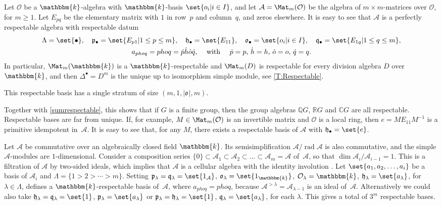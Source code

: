 \documentclass[a4paper,11pt]{amsart}
\numberwithin{equation}{subsection}
\theoremstyle{definition}
\theoremstyle{theorem}
\theoremstyle{remark}
\newcommand\CA{\mathcal{A}}
\newcommand\CO{\mathcal{O}}
\newcommand\plam[1][\lambda]{\mathfrak{p}_{#1}}
\newcommand\hlam[1][\lambda]{\mathfrak{h}_{#1}}
\newcommand\qlam[1][\lambda]{\mathfrak{q}_{#1}}
\newcommand\Olam[1][\lambda]{\CO_{#1}}
\newcommand\olam[1][\lambda]{\mathfrak{o}_{#1}}
\newcommand\op{\operatorname}
\newcommand\C{\mathbb{C}}
\newcommand\Q{\mathbb{Q}}
\newcommand\R{\mathbb{R}}
\newcommand\kk{\mathbbm{k}}
\begin{document}
  \begin{Example}\label{prototype}
    Let $\CO$ be a  $\kk$-algebra with $\kk$-basis
    $\set{o_i|i\in I}$, and let $\CA=\Mat_m(\CO)$ be the algebra of
    $m\times m$-matrices over $\CO$, for $m\ge1$. Let $E_{pq}$ be the
    elementary matrix with $1$ in row~$p$ and column~$q$, and zeros
    elsewhere. It is easy to see that $\CA$ is a perfectly respectable algebra
    with respectable datum
    \begin{equation*}
    \begin{gathered}
    \Lambda=\set{\bullet},\quad \plam[\bullet]=\set{E_{p1}|1\le p\le m},\quad
    \hlam[\bullet]=\set{E_{11}}, \quad \olam[\bullet]=\set{o_i|i\in I},
    \quad\qlam[\bullet]=\set{E_{1q}|1\le q\le m}, \\
     \text{$a_{phoq}=phoq=\dot p\dot h\dot o\dot q,\quad$ with $\quad\dot{p}=p$, $\dot{h}=h$, $\dot{o}=o$, $\dot{q}=q$}.
     \end{gathered}
     \end{equation*}
     In particular, $\Mat_m(\kk)$ is a $\kk$-respectable and $\Mat_m(D)$ is respectable for every division algebra $D$ over~$\kk$, and then $\Delta^\bullet=D^m$ is the unique up to isomorphism simple module, see \autoref{T:Respectable}.

     This respectable basis has a single stratum of size $(m,1,|\olam[]|,m)$.

    Together with \autoref{sumrespectable}, this shows that if $G$ is a
    finite group, then the group algebras $\Q G$, $\R G$ and $\C G$ are
    all respectable. Respectable bases are far from unique. If, for
    example, $M\in\Mat_{m}(\CO)$ is an invertible matrix and $\CO$ is a
    local ring, then $e=ME_{11}M^{-1}$ is a primitive idempotent
    in~$\CA$. It is easy to see that, for any $M$,  there exists
    a respectable basis of $\CA$ with $\hlam[\bullet]=\set{e}$.
  \end{Example}

   \begin{Example}\label{excomm}
   Let $\CA$ be commutative over an algebraically closed field $\kk$. Its semisimplification $\CA/\op{rad}\CA$ is also commutative,  and the
   simple $\CA$-modules are $1$-dimensional. Consider  a composition series
   $\{0\}\subset \CA_1\subset
   \CA_2\subset\ldots\subset \CA_m=\CA$ of~$\CA$, so that $\dim\CA_i/\CA_{i-1}=1$. This is a
   filtration of $\CA$ by two-sided ideals, which implies that $\CA$ is a
   cellular algebra with the identity involution \cite{KX:CellAlg}. Let
   $\set{a_1,a_2,\ldots, a_i}$ be a basis of $\CA_i$ and
   $\Lambda=\{1>2>\cdots>m\}$. Setting $\plam=\qlam=\set{1_{\CA}}$,
   $\olam=\set{1_\kk}$, $\Olam=\kk$, $\hlam=\set{a_\lambda}$, for
   $\lambda\in\Lambda$, defines a $\kk$-respectable basis of~$\CA$, where
   $a_{phoq}=phoq$, because $\CA^{>\lambda}=\CA_{\lambda-1}$ is an ideal of~$\CA$.
 Alternatively we could also take
   $\hlam=\qlam=\set{1}$, $\plam=\set{a_\lambda}$  or
   $\plam=\hlam=\set{1}$, $\qlam=\set{a_\lambda}$, for each
   $\lambda$. This gives a total of $3^m$ respectable bases.
  \end{Example}
\end{document}
